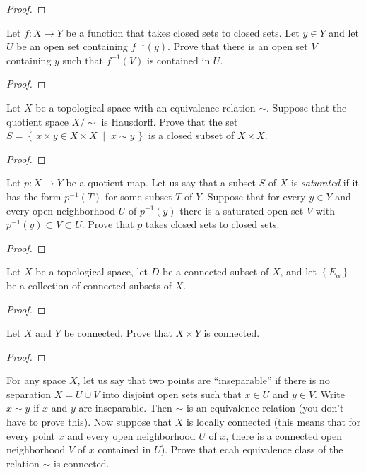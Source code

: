 \begin{proof}
\end{proof}
\begin{problem}
Let $f\colon X\to Y$ be a function that takes closed sets to
closed sets. Let $y\in Y$ and let $U$ be an open set containing
$f^{-1}(y)$. Prove that there is an open set $V$ containing $y$
such that $f^{-1}(V)$ is contained in $U$.
\end{problem}
\begin{proof}
\end{proof}
\begin{problem}
Let $X$ be a topological space with an equivalence relation
$\sim$. Suppose that the quotient space $X/{\sim}$ is
Hausdorff. Prove that the set $S=\left\{\,x\times y\in X\times
  X\;\middle|\;x\sim y\,\right\}$ is a closed subset of $X\times
X$.
\end{problem}
\begin{proof}
\end{proof}
\begin{problem}
Let $p\colon X\to Y$ be a quotient map. Let us say that a subset
$S$ of $X$ is \emph{saturated} if it has the form $p^{-1}(T)$ for
some subset $T$ of $Y$. Suppose that for every $y\in Y$ and every
open neighborhood $U$ of $p^{-1}(y)$ there is a saturated open
set $V$ with $p^{-1}(y)\subset V\subset U$. Prove that $p$ takes
closed sets to closed sets.
\end{problem}
\begin{proof}
\end{proof}
\begin{problem}
Let $X$ be a topological space, let $D$ be a connected subset of
$X$, and let $\left\{E_\alpha\right\}$ be a collection of
connected subsets of $X$.
\end{problem}
\begin{proof}
\end{proof}
\begin{problem}
Let $X$ and $Y$ be connected. Prove that $X\times Y$ is connected.
\end{problem}
\begin{proof}
\end{proof}
\begin{problem}
For any space $X$, let us say that two points are ``inseparable''
if there is no separation $X=U\cup V$ into disjoint open sets
such that $x\in U$ and $y\in V$. Write $x\sim y$ if $x$ and $y$
are inseparable. Then $\sim$ is an equivalence relation (you
don't have to prove this). Now suppose that $X$ is locally
connected (this means that for every point $x$ and every open
neighborhood $U$ of $x$, there is a connected open neighborhood
$V$ of $x$ contained in $U$). Prove that ecah equivalence class
of the relation $\sim$ is connected.
\end{problem}
